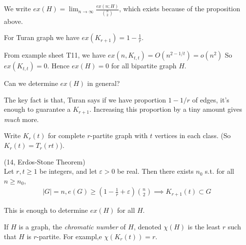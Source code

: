 \documentclass[a4paper]{article}
\begin{document}
We write $ex(H) = \lim_{n \to \infty} \frac{ex(n;H)}{{n \choose 2}}$, which exists because of the proposition above.

For Turan graph we have $ex(K_{r+1}) = 1-\frac{1}{r}$.

From example sheet T11, we have $ex(n,K_{t,t}) = O(n^{2-1/t}) = o(n^2)$ So $ex(K_{t,t}) = 0$. Hence $ex(H) = 0$ for all bipartite graph $H$.

Can we determine $ex(H)$ in general?

The key fact is that, Turan says if we have proportion $1-1/r$ of edges, it's enough to guarantee a $K_{r+1}$. Increasing this proportion by a tiny amount gives \emph{much} more.

\begin{defi}
Write $K_r(t)$ for complete $r$-partite graph with $t$ vertices in each class. (So $K_r(t) = T_r (rt)$).
\end{defi}

\begin{thm} (14, Erd$\ddot{o}$s-Stone Theorem)\\
Let $r,t \geq 1$ be integers, and let $\varepsilon>0$ be real. Then there exists $n_0$ s.t. for all $n \geq n_0$,
\begin{equation*}
\begin{aligned}
|G| = n, e(G) \geq (1-\frac{1}{r} + \varepsilon) {n \choose 2} \implies K_{r+1} (t) \subset G
\end{aligned}
\end{equation*}
\end{thm}

This is enough to determine $ex(H)$ for all $H$.

\begin{defi}
If $H$ is a graph, the \emph{chromatic number} of $H$, denoted $\chi(H)$ is the least $r$ such that $H$ is $r$-partite. For exampl,e $\chi (K_r(t)) = r$.
\end{defi}
\end{document}
